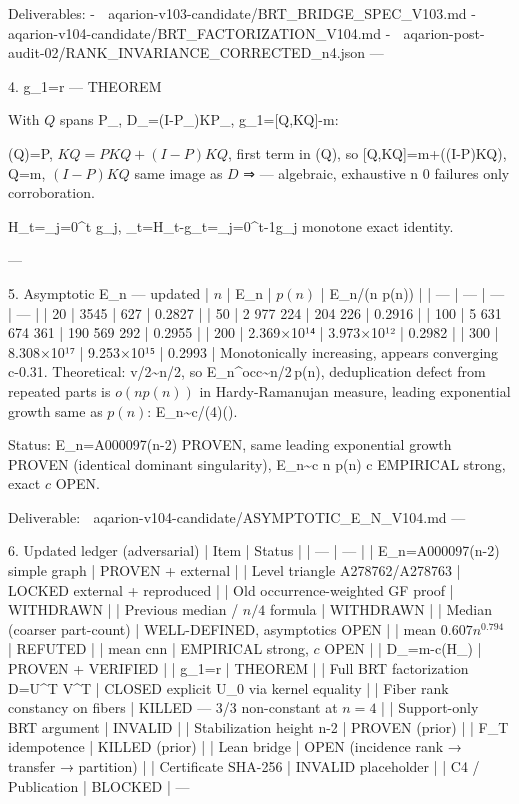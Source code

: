 Deliverables:
-
📎 aqarion-v103-candidate/BRT_BRIDGE_SPEC_V103.md
-
📎 aqarion-v104-candidate/BRT_FACTORIZATION_V104.md
-
📎 aqarion-post-audit-02/RANK_INVARIANCE_CORRECTED_n4.json
---

4. g_1=r — THEOREM

With $Q$ spans P_\Pi, D_\Pi=(I-P_\Pi)KP_\Pi, g_1=[Q,KQ]-m:

(Q)=P, $KQ=P KQ+(I-P)KQ$, first term in (Q), so [Q,KQ]=m+((I-P)KQ), Q=m, $(I-P)KQ$ same image as $D$ ⇒  — algebraic, exhaustive n 0 failures only corroboration.

H_t=\sum_{j=0}^t g_j, \Delta_t=H_t-g_t=\sum_{j=0}^{t-1}g_j monotone exact identity.

---

5. Asymptotic E_n — updated
| $n$ | E_n | $p(n)$ | E_n/(n p(n)) |
| --- | --- | --- | --- |
| 20 | 3545 | 627 | 0.2827 |
| 50 | 2 977 224 | 204 226 | 0.2916 |
| 100 | 5 631 674 361 | 190 569 292 | 0.2955 |
| 200 | 2.369×10¹⁴ | 3.973×10¹² | 0.2982 |
| 300 | 8.308×10¹⁷ | 9.253×10¹⁵ | 0.2993 |
Monotonically increasing, appears converging c-0.31. Theoretical: \sum\lfloor v/2\rfloor\sim n/2, so E_n^{\rm occ}\sim n/2\,p(n), deduplication defect from repeated parts is $o(n p(n))$ in Hardy-Ramanujan measure, leading exponential growth same as $p(n)$: E_n\sim c/(4)\exp(\pi{}).

Status: E_n=A000097(n-2) PROVEN, same leading exponential growth PROVEN (identical dominant singularity), E_n\sim c n p(n) c EMPIRICAL strong, exact $c$ OPEN.

Deliverable:
📎 aqarion-v104-candidate/ASYMPTOTIC_E_N_V104.md
---

6. Updated ledger (adversarial)
| Item | Status |
| --- | --- |
| E_n=A000097(n-2) simple graph | PROVEN + external |
| Level triangle A278762/A278763 | LOCKED external + reproduced |
| Old occurrence-weighted GF proof | WITHDRAWN |
| Previous median / $n/4$ formula | WITHDRAWN |
| Median (coarser part-count) | WELL-DEFINED, asymptotics OPEN |
| mean $0.607n^{0.794}$ | REFUTED |
| mean c\sqrt n\ln n | EMPIRICAL strong, $c$ OPEN |
| D_\Pi=m-c(H_\Pi) | PROVEN + VERIFIED |
| g_1=r | THEOREM |
| Full BRT factorization D=U\partial^T V^T | CLOSED explicit U_0 via kernel equality |
| Fiber rank constancy on \pi fibers | KILLED — 3/3 non-constant at $n=4$ |
| Support-only BRT argument | INVALID |
| Stabilization height \le n-2 | PROVEN (prior) |
| F_T idempotence | KILLED (prior) |
| Lean bridge | OPEN (incidence rank → transfer → partition) |
| Certificate SHA-256 | INVALID placeholder |
| C4 / Publication | BLOCKED |
---

